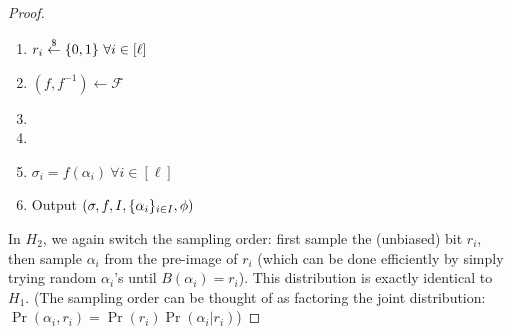 \begin{proof}
\begin{enumerate}
    \item $r_i \overset{\$}{\gets} \{0, 1\} ~\forall i \in [\ell]$
    \item $(f, f^{-1}) \gets \mathcal{F}$
    \item {}
    \item {}
    \item $\sigma_i = f(\alpha_i) ~\forall i \in [\ell]$
    \item Output $(\sigma, f, I, \{\alpha_i\}_{i \in I}, \phi)$
\end{enumerate}
In $H_2$, we again switch the sampling order: first sample the (unbiased) bit
$r_i$, then sample $\alpha_i$ from the pre-image of $r_i$ (which can be done efficiently
by simply trying random $\alpha_i$'s until $B(\alpha_i) = r_i$).
This distribution is exactly identical to $H_1$.
(The sampling order can be thought of as factoring the joint distribution:
$\Pr(\alpha_i, r_i) = \Pr(r_i)\Pr(\alpha_i | r_i)$)


\end{proof}
